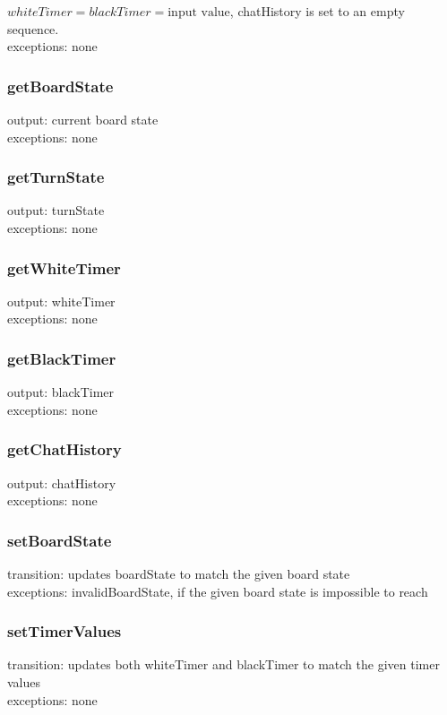 \documentclass{article}
\begin{document}
            $whiteTimer = blackTimer = \textrm{input value}$, chatHistory is set to an empty sequence. \\
            exceptions: none
            
        \subsubsection*{getBoardState} 
            output: current board state \\
            exceptions: none
        
        \subsubsection*{getTurnState} 
            output: turnState \\
            exceptions: none
        
        \subsubsection*{getWhiteTimer} 
            output: whiteTimer \\
            exceptions: none
        
        \subsubsection*{getBlackTimer} 
            output: blackTimer \\
            exceptions: none
        
        \subsubsection*{getChatHistory} 
            output: chatHistory \\
            exceptions: none
        
        \subsubsection*{setBoardState} 
            transition: updates boardState to match the given board state \\
            exceptions: invalidBoardState, if the given board state is impossible to reach
        
        \subsubsection*{setTimerValues} 
            transition: updates both whiteTimer and blackTimer to match the given timer values \\
            exceptions: none
        
\end{document}
